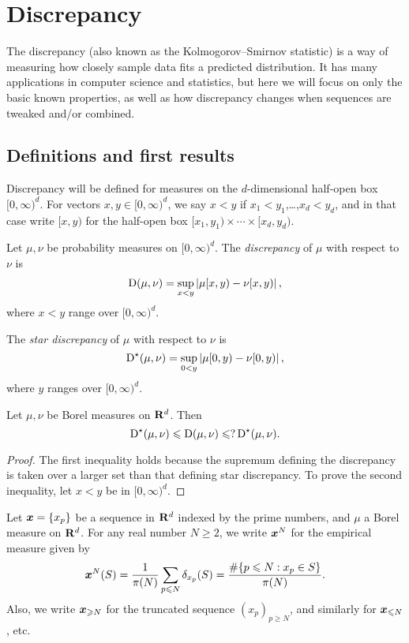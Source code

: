 
\chapter{Discrepancy}





The discrepancy (also known as the Kolmogorov--Smirnov statistic) is a way of 
measuring how closely sample data fits a predicted distribution. It has many 
applications in computer science and statistics, but here we will focus on only 
the basic known properties, as well as how discrepancy changes when sequences 
are tweaked and/or combined. 





\section{Definitions and first results}

Discrepancy will be defined for measures on the $d$-dimensional half-open box 
$[0,\infty)^d$. For vectors $x,y\in [0,\infty)^d$, we say $x<y$ if 
$x_1<y_1$,\dots,$x_d<y_d$, and in that case write $[x,y)$ for the half-open 
box $[x_1,y_1)\times \cdots \times [x_d,y_d)$. 

\begin{definition}
Let $\mu, \nu$ be probability measures on $[0,\infty)^d$. The 
\emph{discrepancy} of $\mu$ with respect to $\nu$ is 
\[
	\operatorname{D}(\mu,\nu) = \sup_{x < y} \left| \mu[x,y) - \nu[x,y)\right| ,
\]
where $x<y$ range over $[0,\infty)^d$.

The \emph{star discrepancy} of $\mu$ with respect to $\nu$ is 
\[
	\operatorname{D}^\star(\mu,\nu) = \sup_{0<y} \left| \mu[0,y) - \nu[0,y)\right| ,
\]
where $y$ ranges over $[0,\infty)^d$. 
\end{definition}

\begin{lemma}
Let $\mu,\nu$ be Borel measures on $\mathbf{R}^d$. Then 
\[
	\operatorname{D}^\star(\mu,\nu) \leqslant \operatorname{D}(\mu,\nu) \leqslant ? \operatorname{D}^\star(\mu,\nu) .
\]
\end{lemma}
\begin{proof}
The first inequality holds because the supremum defining the discrepancy is 
taken over a larger set than that defining star discrepancy. To prove the 
second inequality, let $x<y$ be in $[0,\infty)^d$. 
\end{proof}

Let ${\boldsymbol x} = \{x_p\}$ be a sequence in 
$\mathbf{R}^d$ indexed by the prime numbers, and $\mu$ a Borel measure on $\mathbf{R}^d$. For 
any real number $N\geqslant 2$, we write ${\boldsymbol x}^N$ for the empirical measure 
given by 
\[
	{\boldsymbol x}^N(S) = \frac{1}{\pi(N)} \sum_{p\leqslant N} \delta_{x_p}(S) = \frac{\# \{p\leqslant N : x_p\in S\}}{\pi(N)} .
\]
Also, we write ${\boldsymbol x}_{\geqslant N}$ for the truncated sequence 
$(x_p)_{p\geqslant N}$, and similarly for ${\boldsymbol x}_{\leqslant N}$, etc. 

